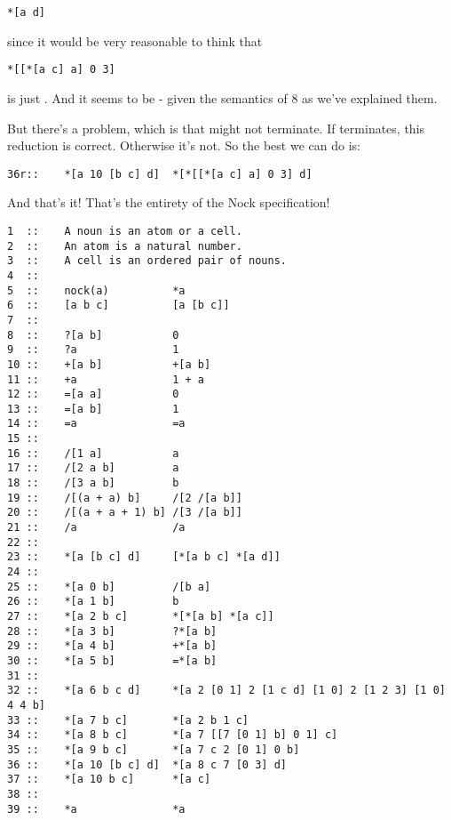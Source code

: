 \begin{framed_shaded}
\begin{Verbatim}[fontsize=\relsize{-2.5},commandchars=\\\{\}]
*[a d]
\end{Verbatim}
\end{framed_shaded}
since it would be very reasonable to think that

\begin{framed_shaded}
\begin{Verbatim}[fontsize=\relsize{-2.5},commandchars=\\\{\}]
*[[*[a c] a] 0 3]
\end{Verbatim}
\end{framed_shaded}

is just .  And it seems to be - given the semantics of 8 as
we've explained them.

But there's a problem, which is that  might not terminate.
If  terminates, this reduction is correct.  Otherwise it's not.
So the best we can do is:

\begin{framed_shaded}
\begin{Verbatim}[fontsize=\relsize{-2.5},commandchars=\\\{\}]
36r::    *[a 10 [b c] d]  *[*[[*[a c] a] 0 3] d]
\end{Verbatim}
\end{framed_shaded}

And that's it! That's the entirety of the Nock specification!

\begin{framed_shaded}
\begin{Verbatim}[fontsize=\relsize{-2.5},commandchars=\\\{\}]
1  ::    A noun is an atom or a cell.
2  ::    An atom is a natural number.
3  ::    A cell is an ordered pair of nouns.
4  ::
5  ::    nock(a)          *a
6  ::    [a b c]          [a [b c]]
7  ::
8  ::    ?[a b]           0
9  ::    ?a               1
10 ::    +[a b]           +[a b]
11 ::    +a               1 + a
12 ::    =[a a]           0
13 ::    =[a b]           1
14 ::    =a               =a
15 ::
16 ::    /[1 a]           a
17 ::    /[2 a b]         a
18 ::    /[3 a b]         b
19 ::    /[(a + a) b]     /[2 /[a b]]
20 ::    /[(a + a + 1) b] /[3 /[a b]]
21 ::    /a               /a
22 ::
23 ::    *[a [b c] d]     [*[a b c] *[a d]]
24 ::
25 ::    *[a 0 b]         /[b a]
26 ::    *[a 1 b]         b
27 ::    *[a 2 b c]       *[*[a b] *[a c]]
28 ::    *[a 3 b]         ?*[a b]
29 ::    *[a 4 b]         +*[a b]
30 ::    *[a 5 b]         =*[a b]
31 ::
32 ::    *[a 6 b c d]     *[a 2 [0 1] 2 [1 c d] [1 0] 2 [1 2 3] [1 0] 4 4 b]
33 ::    *[a 7 b c]       *[a 2 b 1 c]
34 ::    *[a 8 b c]       *[a 7 [[7 [0 1] b] 0 1] c]
35 ::    *[a 9 b c]       *[a 7 c 2 [0 1] 0 b]
36 ::    *[a 10 [b c] d]  *[a 8 c 7 [0 3] d]
37 ::    *[a 10 b c]      *[a c]
38 ::
39 ::    *a               *a
\end{Verbatim}
\end{framed_shaded}